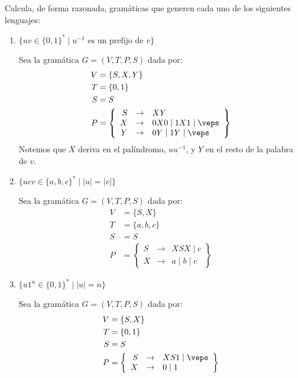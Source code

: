 \begin{ejercicio}
    Calcula, de forma razonada, gramáticas que generen cada uno de los siguientes lenguajes:
    \begin{enumerate}
        \item $\{uv \in \{0,1\}^\ast \mid u^{-1} \text{ es un prefijo de } v\}$
        
        Sea la gramática $G=\left(V,T,P,S\right)$ dada por:
        \begin{align*}
            V &= \{S, X, Y\} \\
            T &= \{0,1\} \\
            S &= S \\
            P &= \left\{
                \begin{array}{rcl}
                    S &\rightarrow & XY \\
                    X &\rightarrow & 0X0 \mid 1X1 \mid \veps \\
                    Y &\rightarrow & 0Y \mid 1Y \mid \veps
                \end{array}
            \right\}
        \end{align*}
        Notemos que $X$ deriva en el palíndromo, $uu^{-1}$, y $Y$ en el resto de la palabra de $v$.
        \item $\{ucv \in \{a,b,c\}^\ast \mid |u| = |v|\}$
        
        Sea la gramática $G=\left(V,T,P,S\right)$ dada por:
        \begin{align*}
            V &= \{S, X\} \\
            T &= \{a,b,c\} \\
            S &= S \\
            P &= \left\{
                \begin{array}{rcl}
                    S &\rightarrow & XSX \mid c \\
                    X &\rightarrow & a \mid b \mid c
                \end{array}
            \right\}
        \end{align*}

        \item $\{u1^n \in \{0,1\}^\ast \mid |u| = n\}$
        
        Sea la gramática $G=\left(V,T,P,S\right)$ dada por:
        \begin{align*}
            V &= \{S, X\} \\
            T &= \{0,1\} \\
            S &= S \\
            P &= \left\{
                \begin{array}{rcl}
                    S &\rightarrow & XS1 \mid \veps \\
                    X &\rightarrow & 0 \mid 1
                \end{array}
            \right\}
        \end{align*}


\end{enumerate}
\end{ejercicio}
